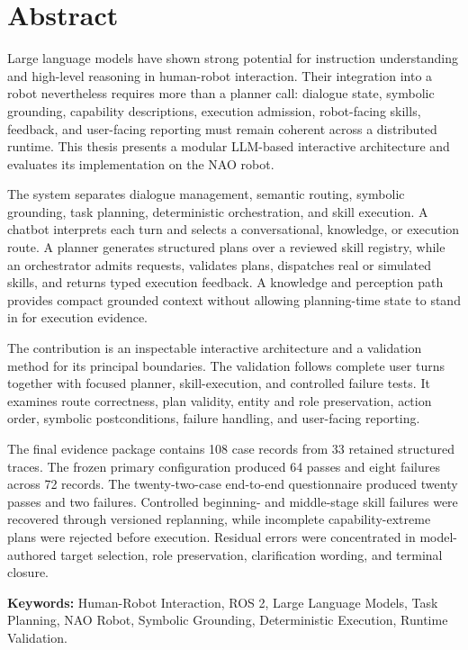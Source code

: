 \chapter*{Abstract}

Large language models have shown strong potential for instruction understanding and high-level reasoning in human-robot interaction. Their integration into a robot nevertheless requires more than a planner call: dialogue state, symbolic grounding, capability descriptions, execution admission, robot-facing skills, feedback, and user-facing reporting must remain coherent across a distributed runtime. This thesis presents a modular LLM-based interactive architecture and evaluates its implementation on the NAO robot.

The system separates dialogue management, semantic routing, symbolic grounding, task planning, deterministic orchestration, and skill execution. A chatbot interprets each turn and selects a conversational, knowledge, or execution route. A planner generates structured plans over a reviewed skill registry, while an orchestrator admits requests, validates plans, dispatches real or simulated skills, and returns typed execution feedback. A knowledge and perception path provides compact grounded context without allowing planning-time state to stand in for execution evidence.

The contribution is an inspectable interactive architecture and a validation method for its principal boundaries. The validation follows complete user turns together with focused planner, skill-execution, and controlled failure tests. It examines route correctness, plan validity, entity and role preservation, action order, symbolic postconditions, failure handling, and user-facing reporting.

The final evidence package contains 108 case records from 33 retained structured traces. The frozen primary configuration produced 64 passes and eight failures across 72 records. The twenty-two-case end-to-end questionnaire produced twenty passes and two failures. Controlled beginning- and middle-stage skill failures were recovered through versioned replanning, while incomplete capability-extreme plans were rejected before execution. Residual errors were concentrated in model-authored target selection, role preservation, clarification wording, and terminal closure.

\vspace{10pt}
\textbf{Keywords:} Human-Robot Interaction, ROS 2, Large Language Models, Task Planning, NAO Robot, Symbolic Grounding, Deterministic Execution, Runtime Validation.
